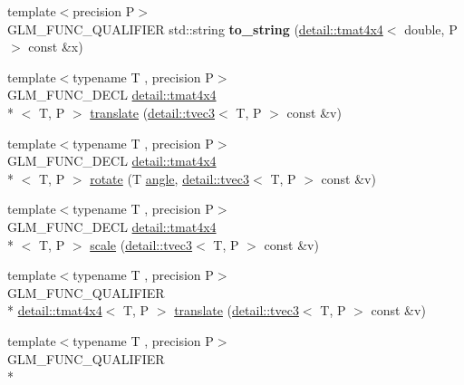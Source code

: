 \begin{DoxyCompactItemize}
\item 
\hypertarget{namespaceglm_a70230acf5f1190df3a56efd0b112a3cc}{{\footnotesize template$<$precision P$>$ }\\G\-L\-M\-\_\-\-F\-U\-N\-C\-\_\-\-Q\-U\-A\-L\-I\-F\-I\-E\-R std\-::string {\bfseries to\-\_\-string} (\hyperlink{structglm_1_1detail_1_1tmat4x4}{detail\-::tmat4x4}$<$ double, P $>$ const \&x)}\label{namespaceglm_a70230acf5f1190df3a56efd0b112a3cc}

\item 
{\footnotesize template$<$typename T , precision P$>$ }\\G\-L\-M\-\_\-\-F\-U\-N\-C\-\_\-\-D\-E\-C\-L \hyperlink{structglm_1_1detail_1_1tmat4x4}{detail\-::tmat4x4}\\*
$<$ T, P $>$ \hyperlink{group__gtx__transform_ga8a2efce0917bf301cc0ea7afb428f688}{translate} (\hyperlink{structglm_1_1detail_1_1tvec3}{detail\-::tvec3}$<$ T, P $>$ const \&v)
\item 
{\footnotesize template$<$typename T , precision P$>$ }\\G\-L\-M\-\_\-\-F\-U\-N\-C\-\_\-\-D\-E\-C\-L \hyperlink{structglm_1_1detail_1_1tmat4x4}{detail\-::tmat4x4}\\*
$<$ T, P $>$ \hyperlink{group__gtx__transform_gaac4ccdbf699a62fe6429005512c0cda5}{rotate} (T \hyperlink{group__gtc__quaternion_ga23a3fc7ada5bbb665ff84c92c6e0542c}{angle}, \hyperlink{structglm_1_1detail_1_1tvec3}{detail\-::tvec3}$<$ T, P $>$ const \&v)
\item 
{\footnotesize template$<$typename T , precision P$>$ }\\G\-L\-M\-\_\-\-F\-U\-N\-C\-\_\-\-D\-E\-C\-L \hyperlink{structglm_1_1detail_1_1tmat4x4}{detail\-::tmat4x4}\\*
$<$ T, P $>$ \hyperlink{group__gtx__transform_ga80eb26a1eb382b7ab1e3631532d21103}{scale} (\hyperlink{structglm_1_1detail_1_1tvec3}{detail\-::tvec3}$<$ T, P $>$ const \&v)
\item 
{\footnotesize template$<$typename T , precision P$>$ }\\G\-L\-M\-\_\-\-F\-U\-N\-C\-\_\-\-Q\-U\-A\-L\-I\-F\-I\-E\-R \\*
\hyperlink{structglm_1_1detail_1_1tmat4x4}{detail\-::tmat4x4}$<$ T, P $>$ \hyperlink{group__gtx__transform_ga8a2efce0917bf301cc0ea7afb428f688}{translate} (\hyperlink{structglm_1_1detail_1_1tvec3}{detail\-::tvec3}$<$ T, P $>$ const \&v)
\item 
{\footnotesize template$<$typename T , precision P$>$ }\\G\-L\-M\-\_\-\-F\-U\-N\-C\-\_\-\-Q\-U\-A\-L\-I\-F\-I\-E\-R \\*

\end{DoxyCompactItemize}
